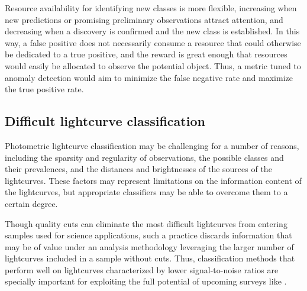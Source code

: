 Resource availability for identifying new classes is more flexible, increasing when new predictions or promising preliminary observations attract attention, and decreasing when a discovery is confirmed and the new class is established.
In this way, a false positive does not necessarily consume a resource that could otherwise be dedicated to a true positive, and the reward is great enough that resources would easily be allocated to observe the potential object.
Thus, a metric tuned to anomaly detection would aim to minimize the false negative rate and maximize the true positive rate.

%

\subsection{Difficult lightcurve classification}
\label{sec:difficult}

Photometric lightcurve classification may be challenging for a number of reasons, including the sparsity and regularity of observations, the possible classes and their prevalences, and the distances and brightnesses of the sources of the lightcurves.
These factors may represent limitations on the information content of the lightcurves, but appropriate classifiers may be able to overcome them to a certain degree.

Though quality cuts can eliminate the most difficult lightcurves from entering samples used for science applications, such a practice discards information that may be of value under an analysis methodology leveraging the larger number of lightcurves included in a sample without cuts.
Thus, classification methods that perform well on lightcurves characterized by lower signal-to-noise ratios are specially important for exploiting the full potential of upcoming surveys like \lsst.

